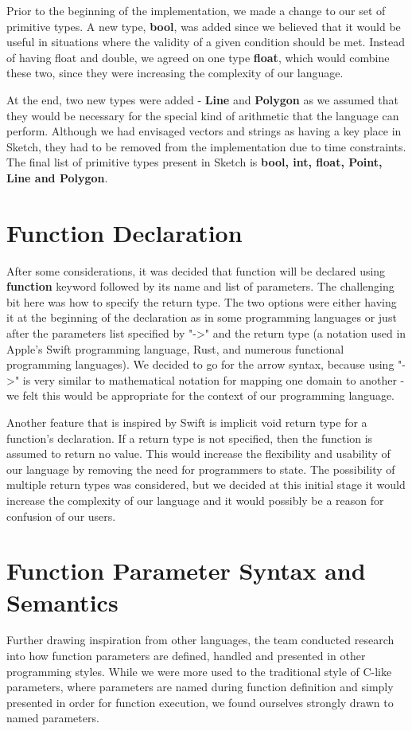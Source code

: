 \documentclass{l3proj}
\begin{document}
Prior to the beginning of the implementation, we made a change to our set of primitive types.  A new type, \textbf{bool}, was added since we believed that it would be useful in situations where the validity of a given condition should be met. Instead of having float and double, we agreed on one type \textbf{float}, which would combine these two, since they were increasing the complexity of our language.  

At the end, two new types were added - \textbf{Line} and \textbf{Polygon} as we assumed that they would be necessary for the special kind of arithmetic that the language can perform. Although we had envisaged vectors and strings as having a key place in Sketch, they had to be removed from the implementation due to time constraints. The final list of primitive types present in Sketch is \textbf{bool, int, float, Point, Line and Polygon}.

\section {Function Declaration}
After some considerations, it was decided that function will be declared using \textbf{function} keyword followed by its name and list of parameters. The challenging bit here was how to specify the return type. The two options were either having it at the beginning of the declaration as in some programming languages or just after the parameters list specified by "-\textgreater" and the return type (a notation used in Apple's Swift programming language, Rust, and numerous functional programming languages). We decided to go for the arrow syntax, because using "-\textgreater" is very similar to mathematical notation for mapping one domain to another - we felt this would be appropriate for the context of our programming language.

Another feature that is inspired by Swift is implicit void return type for a function's declaration. If a return type is not specified, then the function is assumed to return no value. This would increase the flexibility and usability of our language by removing the need for programmers to state.
The possibility of multiple return types was considered, but we decided at this initial stage it would increase the complexity of our language and it would possibly be a reason for confusion of our users.

\section{Function Parameter Syntax and Semantics}
Further drawing inspiration from other languages, the team conducted research into how function parameters are defined, handled and presented in other programming styles. While we were more used to the traditional style of C-like parameters, where parameters are named during function definition and simply presented in order for function execution, we found ourselves strongly drawn to named parameters.
\end{document}
